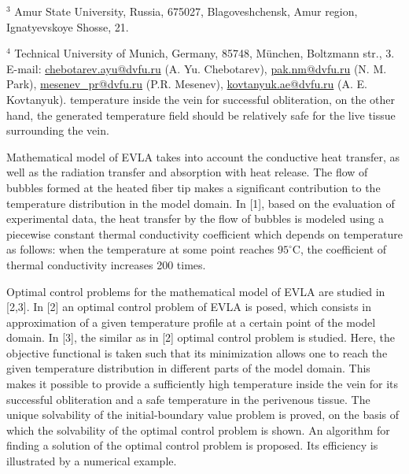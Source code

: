 \documentclass[10pt]{article}
\begin{document}
${ }^{3}$ Amur State University, Russia, 675027, Blagoveshchensk, Amur region, Ignatyevskoye Shosse, 21.

${ }^{4}$ Technical University of Munich, Germany, 85748, München, Boltzmann str., 3. E-mail: \href{mailto:chebotarev.ayu@dvfu.ru}{chebotarev.ayu@dvfu.ru} (A. Yu. Chebotarev), \href{mailto:pak.nm@dvfu.ru}{pak.nm@dvfu.ru} (N. M. Park), \href{mailto:mesenev_pr@dvfu.ru}{mesenev\_pr@dvfu.ru} (P.R. Mesenev), \href{mailto:kovtanyuk.ae@dvfu.ru}{kovtanyuk.ae@dvfu.ru} (A. E. Kovtanyuk). temperature inside the vein for successful obliteration, on the other hand, the generated temperature field should be relatively safe for the live tissue surrounding the vein.

Mathematical model of EVLA takes into account the conductive heat transfer, as well as the radiation transfer and absorption with heat release. The flow of bubbles formed at the heated fiber tip makes a significant contribution to the temperature distribution in the model domain. In [1], based on the evaluation of experimental data, the heat transfer by the flow of bubbles is modeled using a piecewise constant thermal conductivity coefficient which depends on temperature as follows: when the temperature at some point reaches $95^{\circ} \mathrm{C}$, the coefficient of thermal conductivity increases 200 times.

Optimal control problems for the mathematical model of EVLA are studied in [2,3]. In [2] an optimal control problem of EVLA is posed, which consists in approximation of a given temperature profile at a certain point of the model domain. In [3], the similar as in [2] optimal control problem is studied. Here, the objective functional is taken such that its minimization allows one to reach the given temperature distribution in different parts of the model domain. This makes it possible to provide a sufficiently high temperature inside the vein for its successful obliteration and a safe temperature in the perivenous tissue. The unique solvability of the initial-boundary value problem is proved, on the basis of which the solvability of the optimal control problem is shown. An algorithm for finding a solution of the optimal control problem is proposed. Its efficiency is illustrated by a numerical example.
\end{document}
